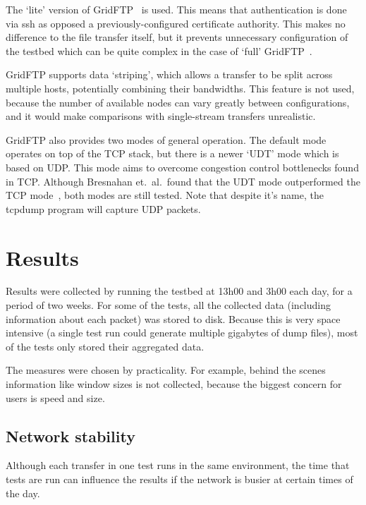 \documentclass{sig-alternate-05-2015}
\begin{document}
The `lite' version of GridFTP~\cite{allcock2005globus} is used. This means that authentication is done via ssh as opposed a previously-configured certificate authority. This makes no difference to the file transfer itself, but it prevents unnecessary configuration of the testbed which can be quite complex in the case of `full' GridFTP~\cite{gridftplite}.

GridFTP supports data `striping', which allows a transfer to be split across multiple hosts, potentially combining their bandwidths. This feature is not used, because the number of available nodes can vary greatly between configurations, and it would make comparisons with single-stream transfers unrealistic.

GridFTP also provides two modes of general operation. The default mode operates on top of the TCP stack, but there is a newer `UDT' mode which is based on UDP\@. This mode aims to overcome congestion control bottlenecks found in TCP\@. Although Bresnahan et.\ al.\ found that the UDT mode outperformed the TCP mode~\cite{bresnahan2009udt}, both modes are still tested. Note that despite it's name, the tcpdump program will capture UDP packets.

\section{Results}
Results were collected by running the testbed at 13h00 and 3h00 each day, for a period of two weeks. For some of the tests, all the collected data (including information about each packet) was stored to disk. Because this is very space intensive (a single test run could generate multiple gigabytes of dump files), most of the tests only stored their aggregated data. 

The measures were chosen by practicality. For example, behind the scenes information like window sizes is not collected, because the biggest concern for users is speed and size.

\subsection{Network stability}
Although each transfer in one test runs in the same environment, the time that tests are run can influence the results if the network is busier at certain times of the day.
\end{document}
